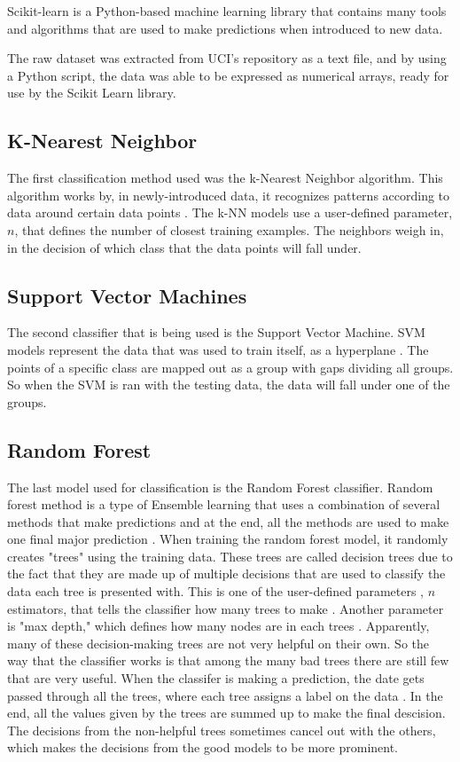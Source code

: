 \documentclass[conference,compsoc]{IEEEtran}
\begin{document}
Scikit-learn  is a Python-based machine learning library \cite{scikit} that contains many tools and algorithms that are used to make predictions when introduced to new data. 

The raw dataset was extracted from UCI's repository as a text file, and by using a Python script, the data was able to be expressed as numerical arrays, ready for use by the Scikit Learn library. 

\subsection{K-Nearest Neighbor}
The first classification method used was the k-Nearest Neighbor algorithm.  This algorithm works by, in newly-introduced data, 
it recognizes patterns according to data around certain data points \cite{random}. The k-NN models use a user-defined parameter, $n$, that defines the 
number of closest training examples. The neighbors weigh in, in the decision of which class that the data points will fall under. 

\subsection{Support Vector Machines}
The second classifier that is being used is the Support Vector Machine. SVM models represent the data that was used to train itself, as a hyperplane \cite{classsvm}. The points of a specific class are mapped out as a group with gaps dividing all groups. So when the SVM is ran with the testing data, the data will fall under one of the groups. 

\subsection{Random Forest}
The last model used for classification is the Random Forest classifier. Random forest method is a type of Ensemble learning that uses a combination of several methods that make predictions and at the end, all the methods are used to make one final major prediction \cite{random}. When training the random forest model, it randomly creates "trees" using the training data. 
These trees are called decision trees due to the fact that they are made up of multiple decisions that are used to classify the data each tree is presented with. This is one of the user-defined parameters , $n$ estimators, that tells the classifier how many trees to make \cite{skforest}. Another parameter is "max depth," which defines how many nodes are in each trees \cite{skforest}. Apparently, many of these decision-making trees are not very helpful on their own. So the way that the classifier works is that among the many bad trees there are still few that are very useful. When the classifer is making a prediction, the date gets passed through all the trees, where each tree assigns a label on the data \cite{random}. In the end, all the values given by the trees are summed up to make the final descision. The decisions from the non-helpful trees sometimes cancel out with the others, which makes the decisions from the good models to be more prominent.
\end{document}
